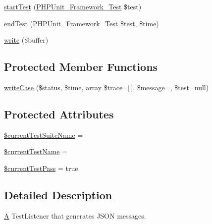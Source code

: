 \begin{DoxyCompactItemize}
\item 
\mbox{\hyperlink{class_p_h_p_unit___util___log___j_s_o_n_a1a9bddc54f26bb3fb5c2ec9778ea5198}{start\+Test}} (\mbox{\hyperlink{interface_p_h_p_unit___framework___test}{P\+H\+P\+Unit\+\_\+\+Framework\+\_\+\+Test}} \$test)
\item 
\mbox{\hyperlink{class_p_h_p_unit___util___log___j_s_o_n_a6de65eea8b294795cbc34c4c8cee8546}{end\+Test}} (\mbox{\hyperlink{interface_p_h_p_unit___framework___test}{P\+H\+P\+Unit\+\_\+\+Framework\+\_\+\+Test}} \$test, \$time)
\item 
\mbox{\hyperlink{class_p_h_p_unit___util___log___j_s_o_n_ab3c1b3a323cbbf707c55cc3cd3efd811}{write}} (\$buffer)
\end{DoxyCompactItemize}
\subsection*{Protected Member Functions}
\begin{DoxyCompactItemize}
\item 
\mbox{\hyperlink{class_p_h_p_unit___util___log___j_s_o_n_a9b26761dd62e5cb1f102906acb02caaa}{write\+Case}} (\$status, \$time, array \$trace=\mbox{[}$\,$\mbox{]}, \$message=\textquotesingle{}\textquotesingle{}, \$test=null)
\end{DoxyCompactItemize}
\subsection*{Protected Attributes}
\begin{DoxyCompactItemize}
\item 
\mbox{\hyperlink{class_p_h_p_unit___util___log___j_s_o_n_acbe7e77aba3ccf6e34c95faf0f21c668}{\$current\+Test\+Suite\+Name}} = \textquotesingle{}\textquotesingle{}
\item 
\mbox{\hyperlink{class_p_h_p_unit___util___log___j_s_o_n_afb0eb34a56be66ae0b4c0cc01eed6efc}{\$current\+Test\+Name}} = \textquotesingle{}\textquotesingle{}
\item 
\mbox{\hyperlink{class_p_h_p_unit___util___log___j_s_o_n_ae8a3cfd157d08b914324a38058a20815}{\$current\+Test\+Pass}} = true
\end{DoxyCompactItemize}


\subsection{Detailed Description}
\mbox{\hyperlink{class_a}{A}} Test\+Listener that generates J\+S\+ON messages. 

